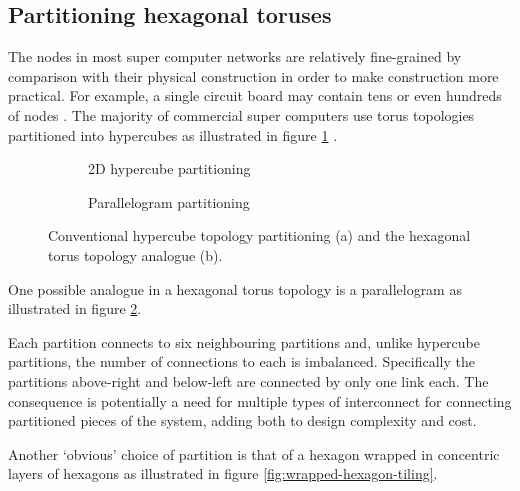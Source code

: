 		\subsection{Partitioning hexagonal toruses}
			
			\label{sec:parititioning}
			
			The nodes in most super computer networks are relatively fine-grained by
			comparison with their physical construction in order to make construction
			more practical. For example, a single circuit board may contain tens or
			even hundreds of nodes \cite{gilge14,ajima12}. The majority of commercial
			super computers use torus topologies partitioned into hypercubes as
			illustrated in figure \ref{fig:hypercube-partitioning}
			\cite{chen11,ajima12}.
			
			\begin{figure}
				\center
				\begin{subfigure}[b]{0.45\textwidth}
					\center
					\caption{2D hypercube partitioning}
					\label{fig:hypercube-partitioning}
				\end{subfigure}
				\begin{subfigure}[b]{0.45\textwidth}
					\center
					\caption{Parallelogram partitioning}
					\label{fig:parallelogram-partitioning}
				\end{subfigure}
				
				\caption{Conventional hypercube topology partitioning (a) and the
				hexagonal torus topology analogue (b).}
				\label{fig:partitioning-options}
			\end{figure}
			
			One possible analogue in a hexagonal torus topology is a parallelogram as
			illustrated in figure \ref{fig:parallelogram-partitioning}.
			
			Each partition connects to six neighbouring partitions and, unlike
			hypercube partitions, the number of connections to each is imbalanced.
			Specifically the partitions above-right and below-left are connected by
			only one link each. The consequence is potentially a need for multiple
			types of interconnect for connecting partitioned pieces of the system,
			adding both to design complexity and cost.
			
			Another `obvious' choice of partition is that of a hexagon wrapped in
			concentric layers of hexagons as illustrated in figure
			\ref{fig:wrapped-hexagon-tiling}.
			
